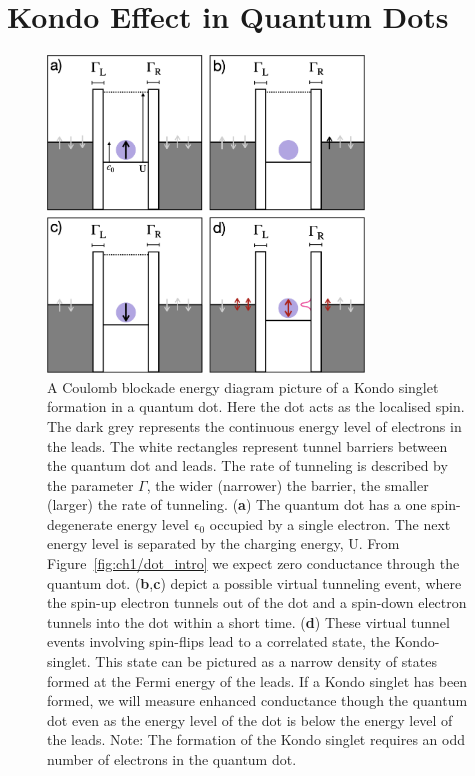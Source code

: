  








\section{Kondo Effect in Quantum Dots}

\begin{figure}[!hbt]
  \begin{center}
    \includegraphics[width=0.75\textwidth]{figures/ch2/crop_FiguresMaster.010.png}
    \caption[Kondo effect in a quantum dot: Coulomb blockade energy diagrams]{\label{fig:ch2/kondo_dot_diagram} 
    A Coulomb blockade energy diagram picture of a Kondo singlet formation in a quantum dot. Here the dot acts as the localised spin. The dark grey represents the continuous energy level of electrons in the leads. The white rectangles represent tunnel barriers between the quantum dot and leads. The rate of tunneling is described by the parameter $\Gamma$, the wider (narrower) the barrier, the smaller (larger) the rate of tunneling. (\textbf{a}) The quantum dot has a one spin-degenerate energy level $\mathrm{\epsilon_0}$ occupied by a single electron. The next energy level is separated by the charging energy, $\mathrm{U}$. From Figure~\ref{fig:ch1/dot_intro} we expect zero conductance through the quantum dot. (\textbf{b},\textbf{c}) depict a possible virtual tunneling event, where the spin-up electron tunnels out of the dot and a spin-down electron tunnels into the dot within a short time. (\textbf{d}) These virtual tunnel events involving spin-flips lead to a correlated state, the Kondo-singlet. This state can be pictured as a narrow density of states formed at the Fermi energy of the leads. If a Kondo singlet has been formed, we will measure enhanced conductance though the quantum dot even as the energy level of the dot is below the energy level of the leads. Note: The formation of the Kondo singlet requires an odd number of electrons in the quantum dot.
}
\end{center}
\end{figure}
